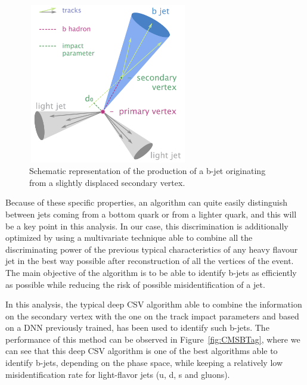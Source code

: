 \documentclass[a4paper, 10pt, openright]{report}
\begin{document}
\begin{figure}[htbp]
\begin{center}
\includegraphics[width=7cm, height=7cm]{figs/CMSBJets.png}
\caption{Schematic representation of the production of a b-jet originating from a slightly displaced secondary vertex.}
\label{fig:CMSBJets}
\end{center}
\end{figure}

Because of these specific properties, an algorithm can quite easily distinguish between jets coming from a bottom quark or from a lighter quark, and this will be a key point in this analysis. In our case, this discrimination is additionally optimized by using a multivariate technique able to combine all the discriminating power of the previous typical characteristics of any heavy flavour jet in the best way possible after reconstruction of all the vertices of the event. The main objective of the algorithm is to be able to identify b-jets as efficiently as possible while reducing the risk of possible misidentification of a jet. 

In this analysis, the typical deep \ac{CSV} algorithm able to combine the information on the secondary vertex with the one on the track impact parameters and based on a \ac{DNN} previously trained, has been used to identify such b-jets. The performance of this method can be observed in Figure~\ref{fig:CMSBTag}, where we can see that this deep \ac{CSV} algorithm is one of the best algorithms able to identify b-jets, depending on the phase space, while keeping a relatively low misidentification rate for light-flavor jets (u, d, s and gluons).
\end{document}
